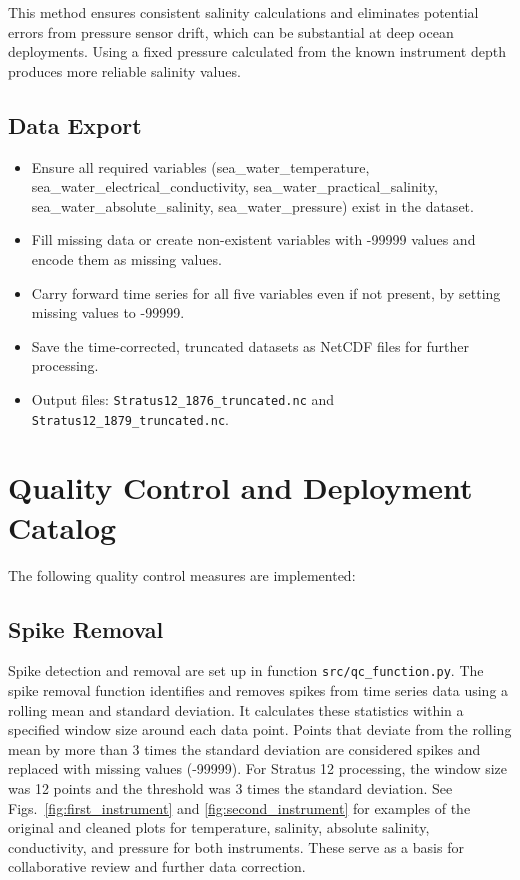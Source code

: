 \documentclass[11pt]{article}
\newcommand{\projectname}{Stratus}  %
\newcommand{\casenumber}{12}  %
\newcommand{\FirstInstrument}{1876}
\newcommand{\SecondInstrument}{1879}
\newcommand{\WindowSize}{12}  %
\newcommand{\ThresholdValue}{3}  %
\begin{document}
This method ensures consistent salinity calculations and eliminates potential errors from pressure sensor drift, 
which can be substantial at deep ocean deployments. 
Using a fixed pressure calculated from the known instrument depth produces more reliable salinity values.

\subsection{Data Export}

\begin{itemize}
\item Ensure all required variables (sea\_water\_temperature, sea\_water\_electrical\_conductivity, sea\_water\_practical\_salinity, sea\_water\_absolute\_salinity, sea\_water\_pressure) exist in the dataset.
\item Fill missing data or create non-existent variables with -99999 values and encode them as missing values.
\item Carry forward time series for all five variables even if not present, by setting missing values to -99999.
\item Save the time-corrected, truncated datasets as NetCDF files for further processing.
\item Output files: 
\texttt{\projectname\casenumber\_\FirstInstrument\_truncated.nc}
and \texttt{\projectname\casenumber\_\SecondInstrument\_truncated.nc}.
\end{itemize}


\section{Quality Control and Deployment Catalog}
The following quality control measures are implemented:

\subsection{Spike Removal}
Spike detection and removal are set up in function \texttt{src/qc\_function.py}. 
The spike removal function identifies and removes spikes from time series data using a rolling mean and standard deviation. 
It calculates these statistics within a specified window size around each data point. 
Points that deviate from the rolling mean by more than \ThresholdValue{} times the standard deviation are considered spikes and replaced with missing values (-99999). 
For \projectname{} \casenumber{} processing, the window size was \WindowSize{} points and the threshold was \ThresholdValue{} times the standard deviation.
See Figs.~\ref{fig:first_instrument} and \ref{fig:second_instrument} for examples of the original and cleaned plots for temperature, salinity, absolute salinity, conductivity, and pressure for both instruments.
These serve as a basis for collaborative review and further data correction.
\end{document}
